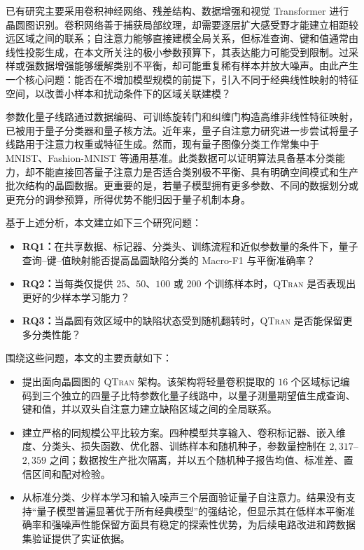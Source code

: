 \documentclass[journal]{IEEEtran}
\newcommand{\qtran}{\textsc{QTran}}
\begin{document}
已有研究主要采用卷积神经网络、残差结构、数据增强和视觉 Transformer 进行晶圆图识别\cite{wang2022residual,yu2023lightweight,fan2024vit}。卷积网络善于捕获局部纹理，却需要逐层扩大感受野才能建立相距较远区域之间的联系；自注意力能够直接建模全局关系，但标准查询、键和值通常由线性投影生成，在本文所关注的极小参数预算下，其表达能力可能受到限制。过采样或强数据增强能够缓解类别不平衡，却可能重复稀有样本并放大噪声。由此产生一个核心问题：能否在不增加模型规模的前提下，引入不同于经典线性映射的特征空间，以改善小样本和扰动条件下的区域关联建模？

参数化量子线路通过数据编码、可训练旋转门和纠缠门构造高维非线性特征映射，已被用于量子分类器和量子核方法\cite{havlicek2019supervised,grant2018hierarchical,schuld2020circuit}。近年来，量子自注意力研究进一步尝试将量子线路用于注意力权重或特征生成\cite{zhao2024qksan,shi2025qsan}。然而，现有量子图像分类工作常集中于 MNIST、Fashion-MNIST 等通用基准。此类数据可以证明算法具备基本分类能力，却不能直接回答量子注意力是否适合类别极不平衡、具有明确空间模式和生产批次结构的晶圆数据。更重要的是，若量子模型拥有更多参数、不同的数据划分或更充分的调参预算，所得优势不能归因于量子机制本身。

基于上述分析，本文建立如下三个研究问题：

\begin{itemize}[leftmargin=1.5em]
  \item \textbf{RQ1：}在共享数据、标记器、分类头、训练流程和近似参数量的条件下，量子查询--键--值映射能否提高晶圆缺陷分类的 Macro-F1 与平衡准确率？
  \item \textbf{RQ2：}当每类仅提供 $25$、$50$、$100$ 或 $200$ 个训练样本时，\qtran{} 是否表现出更好的少样本学习能力？
  \item \textbf{RQ3：}当晶圆有效区域中的缺陷状态受到随机翻转时，\qtran{} 是否能保留更多分类性能？
\end{itemize}

围绕这些问题，本文的主要贡献如下：

\begin{itemize}[leftmargin=1.5em]
  \item 提出面向晶圆图的 \qtran{} 架构。该架构将轻量卷积提取的 $16$ 个区域标记编码到三个独立的四量子比特参数化量子线路中，以量子测量期望值生成查询、键和值，并以双头自注意力建立缺陷区域之间的全局联系。
  \item 建立严格的同规模公平比较方案。四种模型共享输入、卷积标记器、嵌入维度、分类头、损失函数、优化器、训练样本和随机种子，参数量控制在 $2{,}317$--$2{,}359$ 之间；数据按生产批次隔离，并以五个随机种子报告均值、标准差、置信区间和配对检验。
  \item 从标准分类、少样本学习和输入噪声三个层面验证量子自注意力。结果没有支持“量子模型普遍显著优于所有经典模型”的强结论，但显示其在低样本平衡准确率和强噪声性能保留方面具有稳定的探索性优势，为后续电路改进和跨数据集验证提供了实证依据。
\end{itemize}
\end{document}
